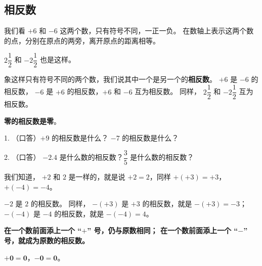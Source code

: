 \subsection{相反数}\label{subsec:1-3}

我们看 $+6$ 和 $-6$ 这两个数，只有符号不同，一正一负。
在数轴上表示这两个数的点，分别在原点的两旁，离开原点的距离相等。

$2\dfrac{1}{2}$ 和 $-2\dfrac{1}{2}$ 也是这样。

象这样只有符号不同的两个数，我们说其中一个是另一个的\textbf{相反数}。
$+6$ 是 $-6$ 的相反数， $-6$ 是 $+6$ 的相反数，$+6$ 和 $-6$ 互为相反数。
同样， $2\dfrac{1}{2}$ 和 $-2\dfrac{1}{2}$ 互为相反数。

\textbf{零的相反数是零}。


\lianxi

1. （口答）$+9$ 的相反数是什么？ $-7$ 的相反数是什么？

2. （口答） $-2.4$ 是什么数的相反数？$\dfrac{3}{5}$ 是什么数的相反数？

\vspace{2em}

我们知道， $+2$ 和 $2$ 是一样的，就是说 $+2 = 2$，同样 $+(+3) = +3$，$+(-4) = -4$。

$-2$ 是 $2$ 的相反数。 同样，
$-(+3)$ 是 $+3$ 的相反数，就是 $-(+3) = -3$；
$-(-4)$ 是 $-4$ 的相反数，就是 $-(-4) = 4$。

\textbf{在一个数前面添上一个 “$+$” 号，仍与原数相同；
在一个数前面添上一个 “$-$” 号，就成为原数的相反数。}

$\bm{+0 = 0}$，$\bm{-0 = 0}$。


\lianxi
\begin{xiaotis}



\end{xiaotis}

